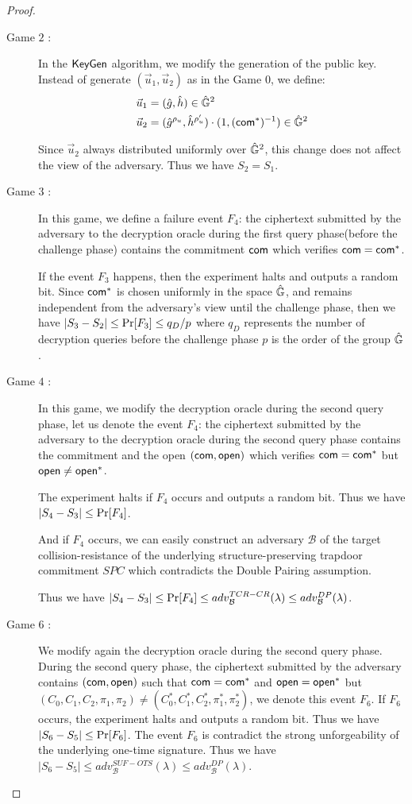 \begin{proof}
\begin{description}
  \item[\textsf{Game} $2$ :] In the ${\mathsf{KeyGen}}$ algorithm, we modify the generation of the public key. Instead of generate $(\vec{u}_1, \vec{u}_2)$ as in the \textsf{Game} 0, we define:
    \begin{align*}
      \vec{u}_1 &= (\hat{g}, \hat{h}) \in \hat{\mathbb{G}}^2\\
      \vec{u}_2 &= (\hat{g}^{\rho_u}, \hat{h}^{\rho_u'}) \cdot (1, (\mathsf{com}^*)^{-1}) \in \hat{\mathbb{G}}^2
    \end{align*}

    Since $\vec{u}_2$ always distributed uniformly over $\hat{\mathbb{G}}^2$, this change does not affect the view of the adversary. Thus we have $S_2 = S_1$.


  \item[\textsf{Game} $3$ :] In this game, we define a failure event $F_4$: the ciphertext submitted by the adversary to the decryption oracle during the first query phase(before the challenge phase) contains the commitment $\mathsf{com}$ which verifies $\mathsf{com} = \mathsf{com}^*$.

    If the event $F_3$ happens, then the experiment halts and outputs a random bit. Since $\mathsf{com}^*$ is chosen uniformly in the space $\hat{\mathbb{G}}$, and remains independent from the adversary's view until the challenge phase, then we have $|S_3 - S_2| \leq \operatorname{Pr}[F_3] \leq q_D/p$ where $q_D$ represents the number of decryption queries before the challenge phase $p$ is the order of the group $\hat{\mathbb{G}}$.

  \item[\textsf{Game} $4$ :] In this game, we modify the decryption oracle during the second query phase, let us denote the event $F_4$: the ciphertext submitted by the adversary to the decryption oracle during the second query phase contains the commitment and the open $(\mathsf{com}, \mathsf{open})$ which verifies $\mathsf{com} = \mathsf{com}^*$ but $\mathsf{open} \neq \mathsf{open}^*$.

    The experiment halts if $F_4$ occurs and outputs a random bit. Thus we have $|S_4- S_3| \leq \operatorname{Pr}[F_4]$.

    And if $F_4$ occurs, we can easily construct an adversary $\mathcal{B}$ of the target collision-resistance of the underlying structure-preserving trapdoor commitment $SPC$ which contradicts the Double Pairing assumption.

    Thus we have $|S_4 - S_3| \leq \operatorname{Pr}[F_4] \leq adv_{\mathcal{B}}^{TCR-CR}(\lambda) \leq adv_{\mathcal{B}}^{DP}(\lambda)$.

  \item[\textsf{Game} $6$ :] We modify again the decryption oracle during the second query phase.
    During the second query phase, the ciphertext submitted by the adversary contains $(\mathsf{com}, \mathsf{open})$ such that $\mathsf{com} = \mathsf{com}^*$ and $\mathsf{open} = \mathsf{open}^*$ but $(C_0, C_1, C_2, \pi_1, \pi_2) \neq (C_0^*, C_1^*, C_2^*, \pi_1^*, \pi_2^*)$, we denote this event $F_6$. If $F_6$ occurs, the experiment halts and outputs a random bit. Thus we have $|S_6 - S_5| \leq \operatorname{Pr}[F_6]$. The event $F_6$ is contradict the strong unforgeability of the underlying one-time signature. Thus we have $|S_6 - S_5| \leq adv_{\mathcal{B}}^{SUF-OTS}(\lambda) \leq adv_{\mathcal{B}}^{DP}(\lambda)$.
    


\end{description}
\end{proof}
